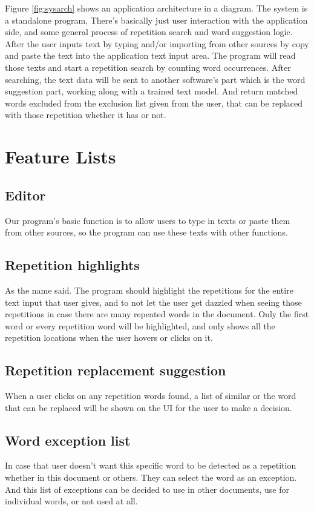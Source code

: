 \documentclass[12pt,oneside,openright,a4paper]{cpe-english-project}
\begin{document}
Figure \ref{fig:sysarch} shows an application architecture in a diagram. The system is a standalone program, There’s basically just user interaction with the application side, and some general process of repetition search and word suggestion logic. After the user inputs text by typing and/or importing from other sources by copy and paste the text into the application text input area. The program will read those texts and start a repetition search by counting word occurrences.  After searching, the text data will be sent to another software’s part which is the word suggestion part, working along with a trained text model. And return matched words excluded from the exclusion list given from the user, that can be replaced with those repetition whether it has or not.

\section{Feature Lists} \label{sec:featlist}

\subsection{Editor}
	Our program’s basic function is to allow users to type in texts or paste them from other sources, so the program can use these texts with other functions.

\subsection{Repetition highlights} \label{subsec:rephigh}
	As the name said. The program should highlight the repetitions for the entire text input that user gives, and to not let the user get dazzled when seeing those repetitions in case there are many repeated words in the document. Only the first word or every repetition word will be highlighted, and only shows all the repetition locations when the user hovers or clicks on it.
\subsection{Repetition replacement suggestion}

	When a user clicks on any repetition words found, a list of similar or the word that can be replaced will be shown on the UI for the user to make a decision.
\subsection{Word exception list}
	In case that user doesn’t want this specific word to be detected as a repetition whether in this document or others. They can select the word as an exception. And this list of exceptions can be decided to use in other documents, use for individual words, or not used at all.
\end{document}
